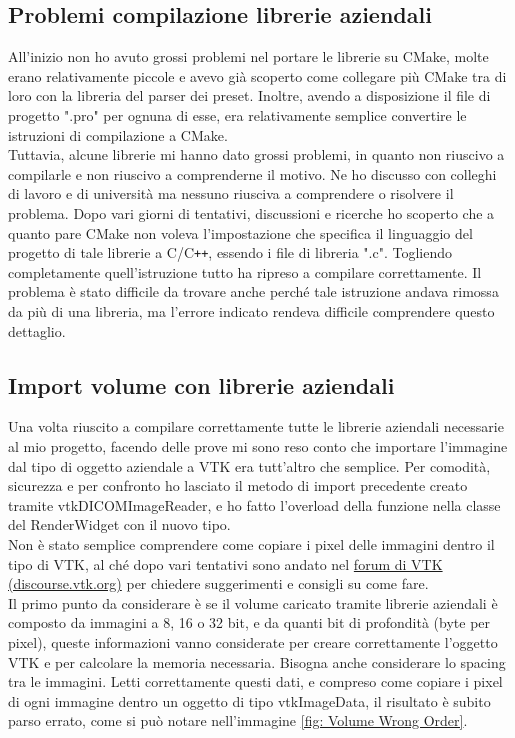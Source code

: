 \subsection{Problemi compilazione librerie aziendali}
All'inizio non ho avuto grossi problemi nel portare le librerie su CMake, molte erano relativamente piccole e avevo già scoperto come collegare più CMake tra di loro con la libreria del parser dei preset. Inoltre, avendo a disposizione il file di progetto ".pro" per ognuna di esse, era relativamente semplice convertire le istruzioni di compilazione a CMake. 
\\
Tuttavia, alcune librerie mi hanno dato grossi problemi, in quanto non riuscivo a compilarle e non riuscivo a comprenderne il motivo. Ne ho discusso con colleghi di lavoro e di università ma nessuno riusciva a comprendere o risolvere il problema. Dopo vari giorni di tentativi, discussioni e ricerche ho scoperto che a quanto pare CMake non voleva l'impostazione che specifica il linguaggio del progetto di tale librerie a C/C\texttt{++}, essendo i file di libreria ".c". Togliendo completamente quell'istruzione tutto ha ripreso a compilare correttamente. Il problema è stato difficile da trovare anche perché tale istruzione andava rimossa da più di una libreria, ma l'errore indicato rendeva difficile comprendere questo dettaglio.

\subsection{Import volume con librerie aziendali}
Una volta riuscito a compilare correttamente tutte le librerie aziendali necessarie al mio progetto, facendo delle prove mi sono reso conto che importare l'immagine dal tipo di oggetto aziendale a VTK era tutt'altro che semplice. Per comodità, sicurezza e per confronto ho lasciato il metodo di import precedente creato tramite vtkDICOMImageReader, e ho fatto l'overload della funzione nella classe del RenderWidget con il nuovo tipo.
\\
Non è stato semplice comprendere come copiare i pixel delle immagini dentro il tipo di VTK, al ché dopo vari tentativi sono andato nel \href{https://discourse.vtk.org/t/trying-to-load-custom-loaded-images-into-vtkimageimport/3704}{forum di VTK (discourse.vtk.org)} per chiedere suggerimenti e consigli su come fare.
\\
Il primo punto da considerare è se il volume caricato tramite librerie aziendali è composto da immagini a 8, 16 o 32 bit, e da quanti bit di profondità (byte per pixel), queste informazioni vanno considerate per creare correttamente l'oggetto VTK e per calcolare la memoria necessaria. Bisogna anche considerare lo spacing tra le immagini. Letti correttamente questi dati, e compreso come copiare i pixel di ogni immagine dentro un oggetto di tipo vtkImageData, il risultato è subito parso errato, come si può notare nell'immagine \ref{fig: Volume Wrong Order}.


